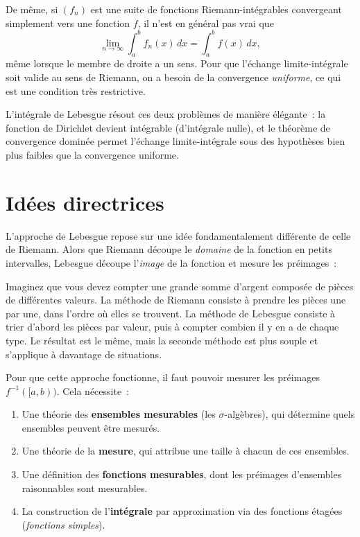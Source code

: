 De m\^eme, si $(f_n)$ est une suite de fonctions Riemann-int\'egrables convergeant
simplement vers une fonction $f$, il n'est en g\'en\'eral pas vrai que
\[
\lim_{n \to \infty} \int_a^b f_n(x)\, dx = \int_a^b f(x)\, dx,
\]
m\^eme lorsque le membre de droite a un sens. Pour que l'\'echange limite-int\'egrale
soit valide au sens de Riemann, on a besoin de la convergence \emph{uniforme}, ce
qui est une condition tr\`es restrictive.

L'int\'egrale de Lebesgue r\'esout ces deux probl\`emes de mani\`ere \'el\'egante~: la
fonction de Dirichlet devient int\'egrable (d'int\'egrale nulle), et le th\'eor\`eme de
convergence domin\'ee permet l'\'echange limite-int\'egrale sous des hypoth\`eses bien
plus faibles que la convergence uniforme.

\section*{Id\'ees directrices}

L'approche de Lebesgue repose sur une id\'ee fondamentalement diff\'erente de celle
de Riemann. Alors que Riemann d\'ecoupe le \emph{domaine} de la fonction en petits
intervalles, Lebesgue d\'ecoupe l'\emph{image} de la fonction et mesure les
pr\'eimages~:

\begin{intuition}[title=\textbf{Philosophie de Lebesgue}]
Imaginez que vous devez compter une grande somme d'argent compos\'ee de pi\`eces de
diff\'erentes valeurs. La m\'ethode de Riemann consiste \`a prendre les pi\`eces une par
une, dans l'ordre o\`u elles se trouvent. La m\'ethode de Lebesgue consiste \`a trier
d'abord les pi\`eces par valeur, puis \`a compter combien il y en a de chaque type.
Le r\'esultat est le m\^eme, mais la seconde m\'ethode est plus souple et s'applique
\`a davantage de situations.
\end{intuition}

Pour que cette approche fonctionne, il faut pouvoir \og mesurer \fg les
pr\'eimages $f^{-1}([a, b))$. Cela n\'ecessite~:
\begin{enumerate}
    \item Une th\'eorie des \textbf{ensembles mesurables} (les $\sigma$-alg\`ebres),
    qui d\'etermine quels ensembles peuvent \^etre mesur\'es.
    \item Une th\'eorie de la \textbf{mesure}, qui attribue une \og taille \fg
    \`a chacun de ces ensembles.
    \item Une d\'efinition des \textbf{fonctions mesurables}, dont les pr\'eimages
    d'ensembles raisonnables sont mesurables.
    \item La construction de l'\textbf{int\'egrale} par approximation via des
    fonctions \'etag\'ees (\emph{fonctions simples}).
\end{enumerate}

